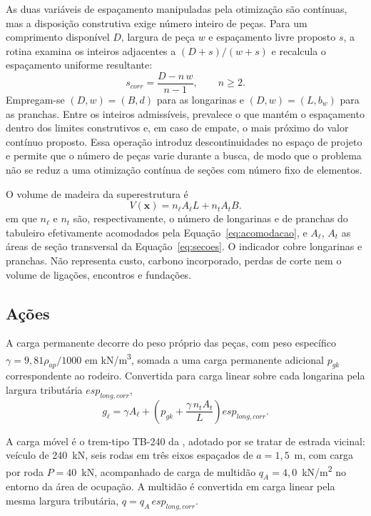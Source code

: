As duas variáveis de espaçamento manipuladas pela otimização são contínuas, mas a disposição construtiva exige número inteiro de peças. Para um comprimento disponível $D$, largura de peça $w$ e espaçamento livre proposto $s$, a rotina examina os inteiros adjacentes a $(D+s)/(w+s)$ e recalcula o espaçamento uniforme resultante:
\begin{equation}
s_{corr}=\frac{D-n\,w}{n-1},\qquad n\geq2.
\label{eq:acomodacao}
\end{equation}
Empregam-se $(D,w)=(B,d)$ para as longarinas e $(D,w)=(L,b_w)$ para as pranchas. Entre os inteiros admissíveis, prevalece o que mantém o espaçamento dentro dos limites construtivos e, em caso de empate, o mais próximo do valor contínuo proposto. Essa operação introduz descontinuidades no espaço de projeto e permite que o número de peças varie durante a busca, de modo que o problema não se reduz a uma otimização contínua de seções com número fixo de elementos.

O volume de madeira da superestrutura é
\begin{equation}
V(\mathbf{x})=n_\ell A_\ell L+n_t A_t B.
\label{eq:volume}
\end{equation}
em que $n_\ell$ e $n_t$ são, respectivamente, o número de longarinas e de pranchas do tabuleiro efetivamente acomodados pela Equação~\eqref{eq:acomodacao}, e $A_\ell$, $A_t$ as áreas de seção transversal da Equação~\eqref{eq:secoes}. O indicador cobre longarinas e pranchas. Não representa custo, carbono incorporado, perdas de corte nem o volume de ligações, encontros e fundações.

\subsection{Ações}\label{sec:acoes}

A carga permanente decorre do peso próprio das peças, com peso específico $\gamma=9{,}81\rho_{ap}/1000$ em kN/m\textsuperscript{3}, somada a uma carga permanente adicional $p_{gk}$ correspondente ao rodeiro. Convertida para carga linear sobre cada longarina pela largura tributária $esp_{long,corr}$,
\begin{equation}
g_\ell=\gamma A_\ell+\left(p_{gk}+\frac{\gamma\,n_t A_t}{L}\right)esp_{long,corr}.
\label{eq:carga_permanente}
\end{equation}

A carga móvel é o trem-tipo TB-240 da \textcite{nbr7188}, adotado por se tratar de estrada vicinal: veículo de 240~kN, seis rodas em três eixos espaçados de $a=1{,}5$~m, com carga por roda $P=40$~kN, acompanhado de carga de multidão $q_A=4{,}0$~kN/m\textsuperscript{2} no entorno da área de ocupação. A multidão é convertida em carga linear pela mesma largura tributária, $q=q_A\,esp_{long,corr}$.

